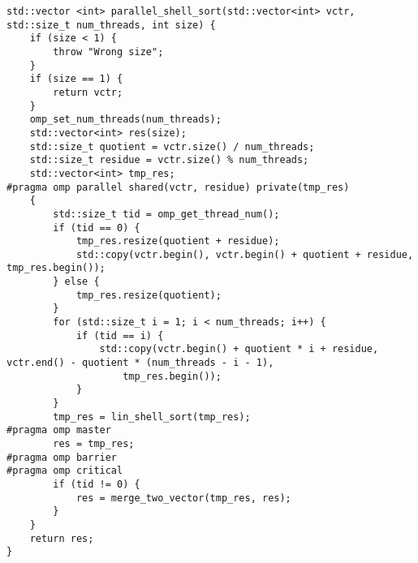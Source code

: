 \documentclass{report}
\begin{document}
\begin{lstlisting}
std::vector <int> parallel_shell_sort(std::vector<int> vctr, std::size_t num_threads, int size) {
    if (size < 1) {
        throw "Wrong size";
    }
    if (size == 1) {
        return vctr;
    }
    omp_set_num_threads(num_threads);
    std::vector<int> res(size);
    std::size_t quotient = vctr.size() / num_threads;
    std::size_t residue = vctr.size() % num_threads;
    std::vector<int> tmp_res;
#pragma omp parallel shared(vctr, residue) private(tmp_res)
    {
        std::size_t tid = omp_get_thread_num();
        if (tid == 0) {
            tmp_res.resize(quotient + residue);
            std::copy(vctr.begin(), vctr.begin() + quotient + residue, tmp_res.begin());
        } else {
            tmp_res.resize(quotient);
        }
        for (std::size_t i = 1; i < num_threads; i++) {
            if (tid == i) {
                std::copy(vctr.begin() + quotient * i + residue, vctr.end() - quotient * (num_threads - i - 1),
                    tmp_res.begin());
            }
        }
        tmp_res = lin_shell_sort(tmp_res);
#pragma omp master
        res = tmp_res;
#pragma omp barrier
#pragma omp critical
        if (tid != 0) {
            res = merge_two_vector(tmp_res, res);
        }
    }
    return res;
}

\end{lstlisting}
\end{document}
